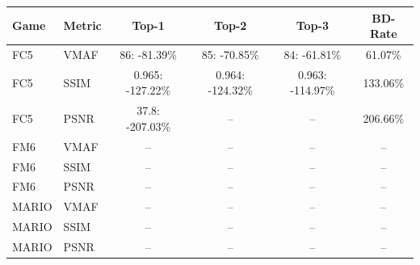 \begin{tabular}{llcccc}
\toprule
Game & Metric & Top-1 & Top-2 & Top-3 & BD-Rate \\
\midrule
FC5 & VMAF & 86: -81.39\% & 85: -70.85\% & 84: -61.81\% & 61.07\% \\
FC5 & SSIM & 0.965: -127.22\% & 0.964: -124.32\% & 0.963: -114.97\% & 133.06\% \\
FC5 & PSNR & 37.8: -207.03\% & -- & -- & 206.66\% \\
\midrule
FM6 & VMAF & -- & -- & -- & -- \\
FM6 & SSIM & -- & -- & -- & -- \\
FM6 & PSNR & -- & -- & -- & -- \\
\midrule
MARIO & VMAF & -- & -- & -- & -- \\
MARIO & SSIM & -- & -- & -- & -- \\
MARIO & PSNR & -- & -- & -- & -- \\
\bottomrule
\end{tabular}
